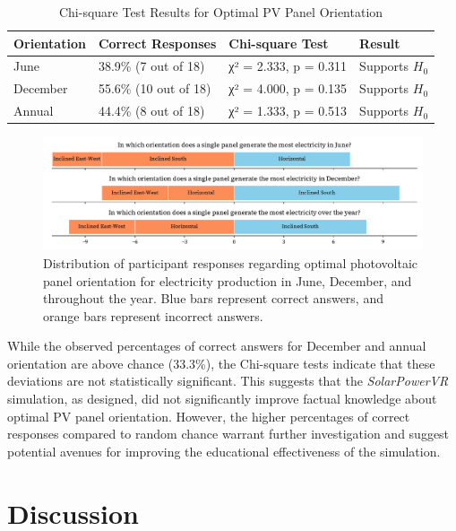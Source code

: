 \documentclass[draft, final]{vutinfth} %
\begin{document}
\begin{table}[h]
    \centering
    \begin{tabular}{llll}
    \toprule
    \textbf{Orientation} & \textbf{Correct Responses} & \textbf{Chi-square Test} & \textbf{Result} \\
    \midrule
    June & 38.9\% (7 out of 18) & χ² = 2.333, p = 0.311 & Supports $H_0$ \\
    December & 55.6\% (10 out of 18) & χ² = 4.000, p = 0.135 & Supports $H_0$ \\
    Annual & 44.4\% (8 out of 18) & χ² = 1.333, p = 0.513 & Supports $H_0$ \\
    \bottomrule
    \end{tabular}
    \caption{Chi-square Test Results for Optimal PV Panel Orientation}
    \label{tab:chi-square-results}
\end{table}

\begin{figure}[]
    \centering
    \includegraphics[width=\textwidth]{graphics/research-3.pdf}
    \caption{Distribution of participant responses regarding optimal photovoltaic panel orientation for electricity production in June, December, and throughout the year. Blue bars represent correct answers, and orange bars represent incorrect answers.}
    \label{fig:research-3}
\end{figure}

While the observed percentages of correct answers for December and annual orientation are above chance (33.3\%), the Chi-square tests indicate that these deviations are not statistically significant.  This suggests that the \textit{SolarPowerVR} simulation, as designed, did not significantly improve factual knowledge about optimal PV panel orientation.  However, the higher percentages of correct responses compared to random chance warrant further investigation and suggest potential avenues for improving the educational effectiveness of the simulation.


\chapter{Discussion}
\end{document}
